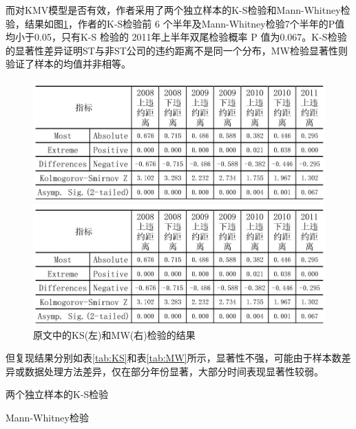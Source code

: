\documentclass[a4paper,12pt]{ctexart}
\begin{document}
而对KMV模型是否有效，作者采用了两个独立样本的K-S检验和Mann-Whitney检验，结果如图\ref{fig:origin}，作者的K-S检验前 6 个半年及Mann-Whitney检验7个半年的P值均小于0.05，只有K-S 检验的 2011年上半年双尾检验概率 P 值为0.067。K-S检验的显著性差异证明ST与非ST公司的违约距离不是同一个分布，MW检验显著性则验证了样本的均值并非相等。
\begin{figure}[H]
    \begin{minipage}{0.48\linewidth}
        \includegraphics[width=\linewidth]{img/ks.jpeg}
    \end{minipage}
    \begin{minipage}{0.48\linewidth}
        \includegraphics[width=\linewidth]{img/mw.jpeg}
    \end{minipage}
    \caption{原文中的KS(左)和MW(右)检验的结果}\label{fig:origin}
\end{figure}

但复现结果分别如表\ref{tab:KS}和表\ref{tab:MW}所示，显著性不强，可能由于样本数差异或数据处理方法差异，仅在部分年份显著，大部分时间表现显著性较弱。
\begin{table}[H]
    \centering
    
    \caption{两个独立样本的K-S检验}\label{tab:KS}
\end{table}
\begin{table}[H]
    \centering
    
    \caption{Mann-Whitney检验}\label{tab:MW}
\end{table}
\end{document}
